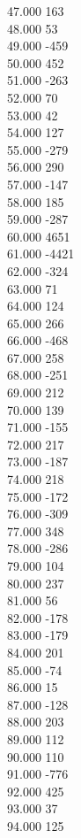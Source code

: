 { 47.000	163 \\
 48.000	53 \\
 49.000	-459 \\
 50.000	452 \\
 51.000	-263 \\
 52.000	70 \\
 53.000	42 \\
 54.000	127 \\
 55.000	-279 \\
 56.000	290 \\
 57.000	-147 \\
 58.000	185 \\
 59.000	-287 \\
 60.000	4651 \\
 61.000	-4421 \\
 62.000	-324 \\
 63.000	71 \\
 64.000	124 \\
 65.000	266 \\
 66.000	-468 \\
 67.000	258 \\
 68.000	-251 \\
 69.000	212 \\
 70.000	139 \\
 71.000	-155 \\
 72.000	217 \\
 73.000	-187 \\
 74.000	218 \\
 75.000	-172 \\
 76.000	-309 \\
 77.000	348 \\
 78.000	-286 \\
 79.000	104 \\
 80.000	237 \\
 81.000	56 \\
 82.000	-178 \\
 83.000	-179 \\
 84.000	201 \\
 85.000	-74 \\
 86.000	15 \\
 87.000	-128 \\
 88.000	203 \\
 89.000	112 \\
 90.000	110 \\
 91.000	-776 \\
 92.000	425 \\
 93.000	37 \\
 94.000	125 \\
}
